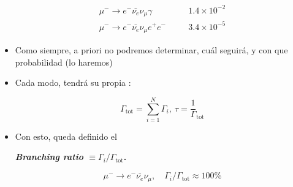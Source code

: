 \documentclass[xetex,mathserif,serif,10pt]{beamer}
\newcommand{\bblock}[1]{{\color{chart12}{#1}}}
\newcommand{\bc}[1]{
  \begin{center}
  #1
  \end{center}
}
\newcommand{\be}[2]{
  \vspace{-0.5em}
  \begin{equation}\label{#2}
    #1
  \end{equation}
  \vspace{-1em}
}
\begin{document}
\begin{frame}
\begin{columns}
\begin{itemize}
\begin{eqnarray*}
        \mu^- \to e^- \bar{\nu_e} \nu_\mu \gamma  &\quad& 1.4\times10^{-2}\\
        \mu^- \to e^- \bar{\nu_e} \nu_\mu e^+ e^- &\quad& 3.4\times10^{-5}
      \end{eqnarray*}
      \item Como siempre, a priori no podremos determinar, cuál seguirá, y con que probabilidad (lo haremos)
      \item Cada modo, tendrá su propia \bblock{tasa de decaimiento $\Gamma_i$}:
        \be{\Gamma_{\mathrm{tot}} = \sum_{i=1}^N \Gamma_i,\ \tau = \frac 1 \Gamma_{\mathrm{tot}} }{EQDecayRate}
      \item Con esto, queda definido el
      \bc{{\bf{\alert{\emph{Branching ratio}}} $\equiv \Gamma_i / \Gamma_{\mathrm{tot}}$.}}
      \vspace{-0em}
      \[ \mu^- \to e^- \bar{\nu_e} \nu_\mu,\quad \Gamma_i / \Gamma_{\mathrm{tot}} \approx 100\% \]
    \end{itemize}
  \end{columns}
\end{frame}
\end{document}
